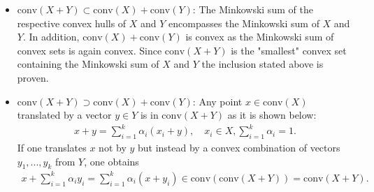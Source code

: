 \documentclass{article}
\begin{document}
\begin{itemize}
    \item $\mathrm{conv}(X+Y) \subset \mathrm{conv}(X) + \mathrm{conv}(Y)$: The Minkowski sum of the respective convex hulls of $X$ and $Y$ encompasses the Minkowski sum of $X$ and $Y$. In addition, $\mathrm{conv}(X) + \mathrm{conv}(Y)$ is convex as the Minkowski sum of convex sets is again convex. Since $\mathrm{conv}(X+Y)$ is the "smallest" convex set containing the Minkowski sum of $X$ and $Y$ the inclusion stated above is proven.
    
    \item $\mathrm{conv}(X+Y) \supset \mathrm{conv}(X) + \mathrm{conv}(Y)$: Any point $x \in \mathrm{conv}(X)$ translated by a vector $y \in Y$ is in $\mathrm{conv}(X+Y)$ as it is shown below: 
    \begin{align*}
        x + y = \sum_{i=1}^k \alpha_i (x_i + y),
        \quad x_i \in X, \sum^k_{i=1} \alpha_i = 1.
    \end{align*}
    If one translates $x$ not by $y$ but instead by a convex combination of vectors $y_1,...,y_k$ from $Y$, one obtains 
    \begin{align*}
        x + \sum_{i=1}^k \alpha_i y_i 
        = \sum_{i=1}^k \alpha_i(x + y_i) 
        \in \mathrm{conv}\left(\mathrm{conv}(X+Y)\right) 
        = \mathrm{conv}(X+Y).
    \end{align*}
\end{itemize}
\end{document}
